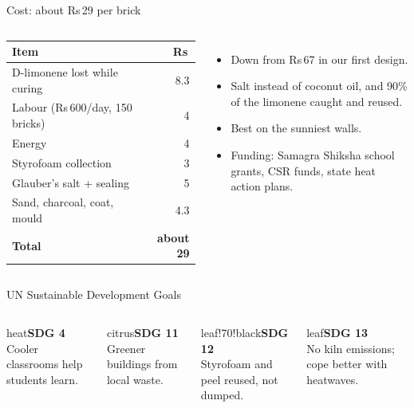 \documentclass[aspectratio=169,10pt]{beamer}
\newcommand{\rupeesym}{Rs\,}
\begin{document}
\begin{frame}{Cost: about \rupeesym29 per brick}
\begin{columns}[T]
\small
\begin{tabular}{@{}lr@{}}
\toprule
Item & \rupeesym \\
\midrule
D-limonene lost while curing & 8.3 \\
Labour (\rupeesym600/day, 150 bricks) & 4 \\
Energy & 4 \\
Styrofoam collection & 3 \\
Glauber's salt + sealing & 5 \\
Sand, charcoal, coat, mould & 4.3 \\
\midrule
\textbf{Total} & \textbf{about 29} \\
\bottomrule
\end{tabular}
\begin{itemize}
  \item Down from \rupeesym67 in our first design.
  \item Salt instead of coconut oil, and 90\% of the limonene caught and reused.
  \item Best on the sunniest walls.
  \item Funding: Samagra Shiksha school grants, CSR funds, state heat action plans.
\end{itemize}
\end{columns}
\end{frame}

\begin{frame}{UN Sustainable Development Goals}
\begin{columns}[T]
\begin{card}{heat}\textbf{SDG 4}\\ Cooler classrooms help students learn.\end{card}
\begin{card}{citrus}\textbf{SDG 11}\\ Greener buildings from local waste.\end{card}
\begin{card}{leaf!70!black}\textbf{SDG 12}\\ Styrofoam and peel reused, not dumped.\end{card}
\begin{card}{leaf}\textbf{SDG 13}\\ No kiln emissions; cope better with heatwaves.\end{card}
\end{columns}
\end{frame}
\end{document}
